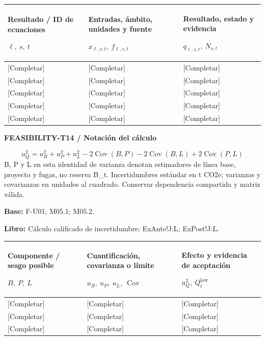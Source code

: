 {\sffamily\fontsize{8.3}{10.3}\selectfont\begin{longtable}{@{}P{49.49mm} P{65.99mm} P{49.49mm}@{}}
\toprule
\textbf{Resultado / ID de ecuaciones}\par {\normalfont\fontsize{8.2}{10}\selectfont $\ell,\ s,\ t$} & \textbf{Entradas, ámbito, unidades y fuente}\par {\normalfont\fontsize{8.2}{10}\selectfont $x_{\ell,s,t},\ f_{\ell,s,t}$} & \textbf{Resultado, estado y evidencia}\par {\normalfont\fontsize{8.2}{10}\selectfont $q_{\ell,s,t},\ N_{s,t}$}\\\midrule\endhead
\rule{0pt}{7.7mm}[Completar] & [Completar] & [Completar]\\\hline
\rule{0pt}{7.7mm}[Completar] & [Completar] & [Completar]\\\hline
\rule{0pt}{7.7mm}[Completar] & [Completar] & [Completar]\\\hline
\rule{0pt}{7.7mm}[Completar] & [Completar] & [Completar]\\\hline
\rule{0pt}{7.7mm}[Completar] & [Completar] & [Completar]\\\hline
\end{longtable}}
\par\begingroup\sffamily\fontsize{8}{10}\selectfont\color{NEBGreen}\setlength{\parskip}{2pt}\setlength{\abovedisplayskip}{4pt}\setlength{\belowdisplayskip}{4pt}\setlength{\abovedisplayshortskip}{2pt}\setlength{\belowdisplayshortskip}{3pt}
\textbf{FEASIBILITY-T14 / Notación del cálculo}\par
{\fontsize{9}{11}\selectfont\[ u_Q^2=u_B^2+u_P^2+u_L^2-2\operatorname{Cov}(B,P)-2\operatorname{Cov}(B,L)+2\operatorname{Cov}(P,L) \]}
B, P y L en esta identidad de varianza denotan estimadores de línea base, proyecto y fugas, no reserva B\_t. Incertidumbres estándar en t CO2e; varianzas y covarianzas en unidades al cuadrado. Conservar dependencia compartida y matriz válida.\par
\textbf{Base:} F-U01; M05.1; M05.2.\par
\textbf{Libro:} Cálculo calificado de incertidumbre; ExAnte!J:L; ExPost!J:L.\par\endgroup
{\sffamily\fontsize{8.3}{10.3}\selectfont\begin{longtable}{@{}P{51.14mm} P{62.69mm} P{51.14mm}@{}}
\toprule
\textbf{Componente / sesgo posible}\par {\normalfont\fontsize{8.2}{10}\selectfont $B,\ P,\ L$} & \textbf{Cuantificación, covarianza o límite}\par {\normalfont\fontsize{8.2}{10}\selectfont $u_B,\ u_P,\ u_L,\ \operatorname{Cov}$} & \textbf{Efecto y evidencia de aceptación}\par {\normalfont\fontsize{8.2}{10}\selectfont $u_Q^2,\ Q_t^{\mathrm{low}}$}\\\midrule\endhead
\rule{0pt}{7.7mm}[Completar] & [Completar] & [Completar]\\\hline
\rule{0pt}{7.7mm}[Completar] & [Completar] & [Completar]\\\hline
\rule{0pt}{7.7mm}[Completar] & [Completar] & [Completar]\\\hline
\end{longtable}}
